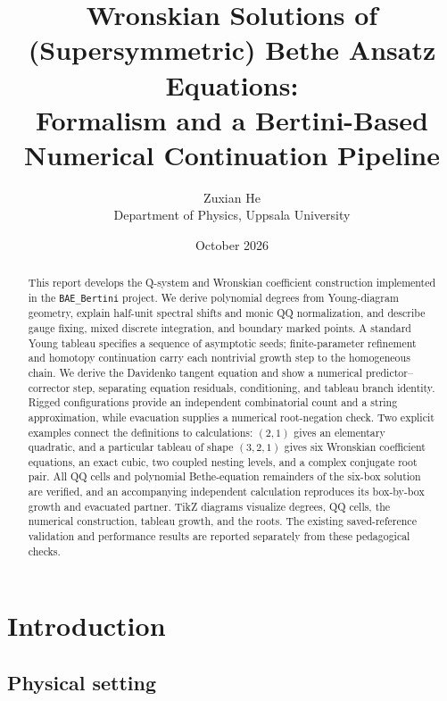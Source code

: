\documentclass[11pt]{article}
\title{\textbf{Wronskian Solutions of (Supersymmetric) Bethe Ansatz Equations:\\
Formalism and a Bertini-Based Numerical Continuation Pipeline}}
\author{Zuxian He \\ \small Department of Physics, Uppsala University}
\date{October 2026}
\newcommand{\file}[1]{\texttt{#1}}
\begin{document}
\maketitle

\begin{abstract}
This report develops the Q-system and Wronskian coefficient construction
implemented in the \file{BAE\_Bertini} project. We derive polynomial degrees
from Young-diagram geometry, explain half-unit spectral shifts and monic
QQ normalization, and describe gauge fixing, mixed discrete integration,
and boundary marked points. A standard Young tableau specifies a sequence
of asymptotic seeds; finite-parameter refinement and homotopy continuation
carry each nontrivial growth step to the homogeneous chain. We derive the
Davidenko tangent equation and show a numerical predictor--corrector step,
separating equation residuals, conditioning, and tableau branch identity.
Rigged configurations provide an independent combinatorial count and a
string approximation, while evacuation supplies a numerical root-negation
check. Two explicit examples connect the definitions to calculations:
$(2,1)$ gives an elementary quadratic, and a particular tableau of shape
$(3,2,1)$ gives six Wronskian coefficient equations, an exact cubic, two
coupled nesting levels, and a complex conjugate root pair. All QQ cells
and polynomial Bethe-equation remainders of the six-box solution are
verified, and an accompanying independent calculation reproduces its
box-by-box growth and evacuated partner. TikZ diagrams visualize degrees,
QQ cells, the numerical construction, tableau growth, and the roots.
The existing saved-reference validation and performance results are
reported separately from these pedagogical checks.
\end{abstract}

\newpage
\tableofcontents
\newpage

\section{Introduction}

\subsection{Physical setting}
\end{document}
